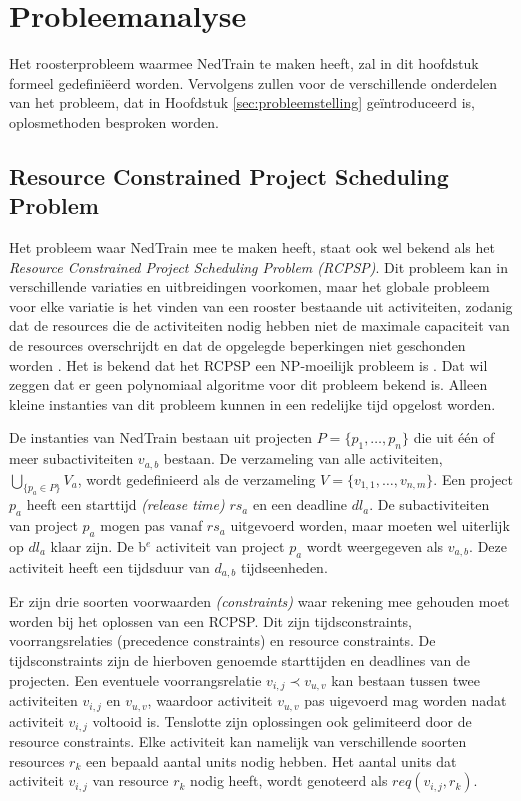 \section{Probleemanalyse}
\label{sec:probleemanalyse}

Het roosterprobleem waarmee NedTrain te maken heeft, zal in dit hoofdstuk formeel gedefini\"eerd worden. Vervolgens zullen voor de verschillende onderdelen van het probleem, dat in Hoofdstuk \ref{sec:probleemstelling} ge\"introduceerd is, oplosmethoden besproken worden.

\subsection{Resource Constrained Project Scheduling Problem}
Het probleem waar NedTrain mee te maken heeft, staat ook wel bekend als het \emph{Resource Constrained Project Scheduling Problem (RCPSP)}. Dit probleem kan in verschillende variaties en uitbreidingen voorkomen, maar het globale probleem voor elke variatie is het vinden van een rooster bestaande uit activiteiten, zodanig dat de resources die de activiteiten nodig hebben niet de maximale capaciteit van de resources overschrijdt en dat de opgelegde beperkingen niet geschonden worden \cite{lombardi2010constraint}. Het is bekend dat het RCPSP een NP-moeilijk probleem is \cite{blazewicz1983scheduling}. Dat wil zeggen dat er geen polynomiaal algoritme voor dit probleem bekend is. Alleen kleine instanties van dit probleem kunnen in een redelijke tijd opgelost worden. 

De instanties van NedTrain bestaan uit projecten $P = \{p_1, \dots , p_n\}$ die uit \'e\'en of meer subactiviteiten $v_{a,b}$ bestaan. De verzameling van alle activiteiten, $\bigcup_{\{p_a \in P\}} V_a$, wordt gedefinieerd als de verzameling $V = \{v_{1,1}, \dots , v_{n,m}\}$. Een project $p_a$ heeft een starttijd \emph{(release time)} $rs_a$ en een deadline $dl_a$. De subactiviteiten van project $p_a$ mogen pas vanaf $rs_a$ uitgevoerd worden, maar moeten wel uiterlijk op $dl_a$ klaar zijn. De b$^e$ activiteit van project $p_a$ wordt weergegeven als $v_{a,b}$. Deze activiteit heeft een tijdsduur van $d_{a,b}$ tijdseenheden.

Er zijn drie soorten voorwaarden \emph{(constraints)} waar rekening mee gehouden moet worden bij het oplossen van een RCPSP. Dit zijn tijdsconstraints, voorrangsrelaties (precedence constraints) en resource constraints. De tijdsconstraints zijn de hierboven genoemde starttijden en deadlines van de projecten. Een eventuele voorrangsrelatie $v_{i,j} \prec v_{u,v}$ kan bestaan tussen twee activiteiten $v_{i,j}$ en $v_{u,v}$, waardoor activiteit $v_{u,v}$ pas uigevoerd mag worden nadat activiteit $v_{i,j}$ voltooid is. Tenslotte zijn oplossingen ook gelimiteerd door de resource constraints. Elke activiteit kan namelijk van verschillende soorten resources $r_k$ een bepaald aantal units nodig hebben. Het aantal units dat activiteit $v_{i,j}$ van resource $r_k$ nodig heeft, wordt genoteerd als $req(v_{i,j},r_k)$.

